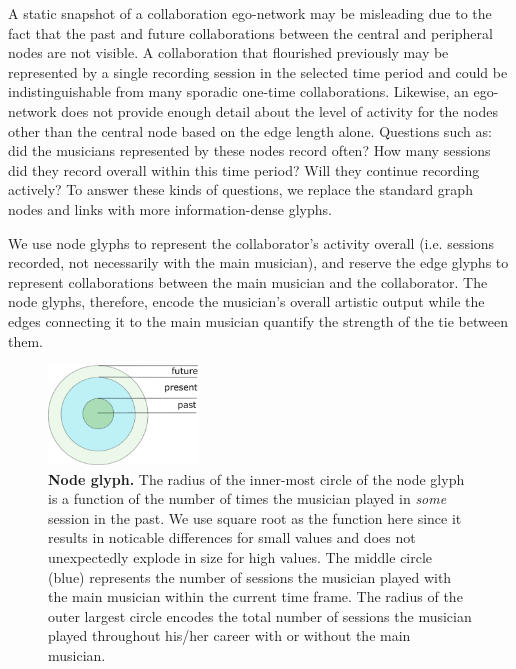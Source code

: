 \documentclass[12pt]{cmuthesis}
\begin{document}
  A static snapshot of a collaboration ego-network may be misleading due to the fact
  that the past and future collaborations between the central and peripheral nodes
  are not visible. A collaboration that flourished previously may be represented
  by a single recording session in the selected time period and could be
  indistinguishable from many sporadic one-time collaborations. Likewise, an
  ego-network does not provide enough detail about the level of activity for the
  nodes other than the central node based on the edge length alone. Questions such
  as: did the musicians represented by these nodes record often? How many sessions
  did they record overall within this time period? Will they continue recording
  actively? To answer these kinds of questions, we replace the standard graph
  nodes and links with more information-dense glyphs.

  We use node glyphs to represent the collaborator's activity overall
  (i.e. sessions recorded, not necessarily with the main musician), and reserve
  the edge glyphs to represent collaborations between the main musician and the
  collaborator. The node glyphs, therefore, encode the musician's overall artistic
  output while the edges connecting it to the main musician quantify the strength
  of the tie between them.

  \begin{figure}[ht]
    \centering
    \includegraphics[height=100px]{figures/node-glyph}
    \caption{\textbf{Node glyph.} The radius of the inner-most circle of the node glyph is a function of the number of times the musician played in \emph{some} session in the past. We use square root as the function here since it results in noticable differences for small values and does not unexpectedly explode in size for high values. The middle circle (blue) represents the number of sessions the musician played with the main musician within the current time frame. The radius of the outer largest circle encodes the total number of sessions the musician played throughout his/her career with or without the main musician.}
    \label{fig:moj:node_glyphs}
  \end{figure}
\end{document}

